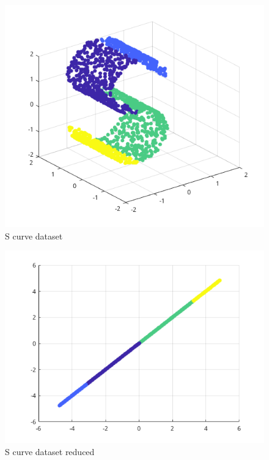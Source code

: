 \documentclass[12pt,journal]{IEEEtran}
\begin{document}
\begin{figure}[H]                                                                
    \centering                                                                   
    \includegraphics[width=0.9\linewidth]{images/s_curve.png}                    
    \caption{S curve dataset}                                                    
    \label{s_curve}                                                              
\end{figure}                                                                     
                                                                                 
\begin{figure}[H]                                                                
    \centering                                                                   
    \includegraphics[width=0.9\linewidth]{images/s_curve_result.png}             
    \caption{S curve dataset reduced}                                            
    \label{s_curve_res}                                                          
\end{figure}
\end{document}
